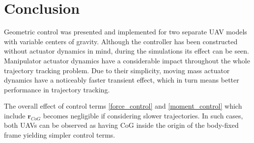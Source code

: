 \section{Conclusion}

Geometric control was presented and implemented for two separate UAV models with variable centers of gravity. Although the controller has been constructed without actuator dynamics in mind, during the simulations its effect can be seen. Manipulator actuator dynamics have a considerable impact throughout the whole trajectory tracking problem. Due to their simplicity, moving mass actuator dynamics have a noticeably faster transient effect, which in turn means better performance in trajectory tracking. 

The overall effect of control terms \ref{force_control} and \ref{moment_control} which include $\textbf{r}_{CoG}$ becomes negligible if considering slower trajectories. In such cases, both UAVs can be observed as having CoG inside the origin of the body-fixed frame yielding simpler control terms.
